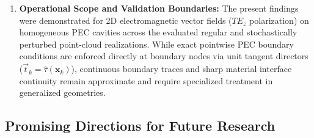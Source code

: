 \documentclass[preprint,12pt]{elsarticle}
\begin{document}
\begin{enumerate}
    \item \textbf{Operational Scope and Validation Boundaries:} 
    The present findings were demonstrated for 2D electromagnetic vector fields ($TE_z$ polarization) on homogeneous PEC cavities across the evaluated regular and stochastically perturbed point-cloud realizations. While exact pointwise PEC boundary conditions are enforced directly at boundary nodes via unit tangent directors ($\vec{t}_k = \hat{\tau}(\mathbf{x}_k)$), continuous boundary traces and sharp material interface continuity remain approximate and require specialized treatment in generalized geometries.
\end{enumerate}

\subsection{Promising Directions for Future Research}
\label{subsec:future_works}
\end{document}
